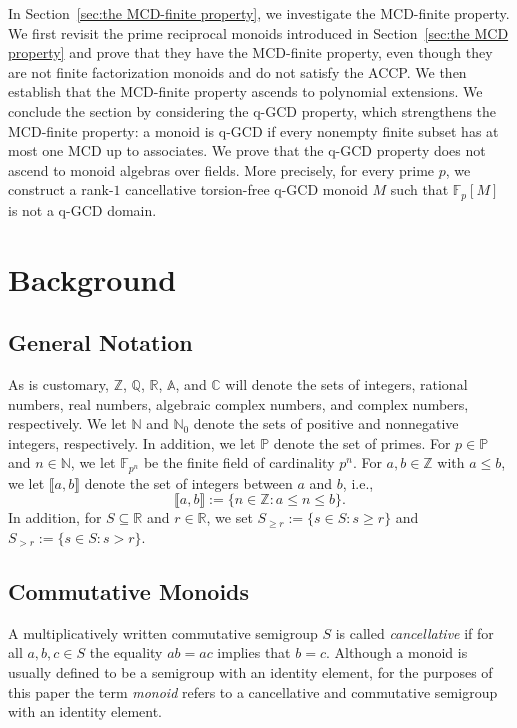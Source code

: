 \documentclass[10pt]{amsart}
\theoremstyle{definition}
\theoremstyle{remark}
\numberwithin{equation}{section}
\newcommand{\aaa}{\mathbb{A}}
\newcommand{\cc}{\mathbb{C}}
\newcommand{\ff}{\mathbb{F}}
\newcommand{\nn}{\mathbb{N}}
\newcommand{\pp}{\mathbb{P}}
\newcommand{\qq}{\mathbb{Q}}
\newcommand{\rr}{\mathbb{R}}
\newcommand{\zz}{\mathbb{Z}}
\providecommand\ldb{\llbracket}
\providecommand\rdb{\rrbracket}
\begin{document}
In Section~\ref{sec:the MCD-finite property}, we investigate the MCD-finite property. We first revisit the prime reciprocal monoids introduced in Section~\ref{sec:the MCD property} and prove that they have the MCD-finite property, even though they are not finite factorization monoids and do not satisfy the ACCP. We then establish that the MCD-finite property ascends to polynomial extensions. We conclude the section by considering the q-GCD property, which strengthens the MCD-finite property: a monoid is q-GCD if every nonempty finite subset has at most one MCD up to associates. We prove that the q-GCD property does not ascend to monoid algebras over fields. More precisely, for every prime $p$, we construct a rank-$1$ cancellative torsion-free q-GCD monoid $M$ such that $\ff_p[M]$ is not a q-GCD domain.







\bigskip
\section{Background}
\label{sec:background}

\smallskip
\subsection{General Notation}

As is customary, $\zz$, $\qq$, $\rr$, $\aaa$, and $\cc$ will denote the sets of integers, rational numbers, real numbers, algebraic complex numbers, and complex numbers, respectively. We let $\nn$ and $\nn_0$ denote the sets of positive and nonnegative integers, respectively. In addition, we let $\pp$ denote the set of primes. For $p \in \pp$ and $n \in \nn$, we let $\ff_{p^n}$ be the finite field of cardinality $p^n$. For $a,b \in \zz$ with $a \le b$, we let $\ldb a,b \rdb$ denote the set of integers between $a$ and $b$, i.e.,
\[
  \ldb a,b \rdb := \{n \in \zz : a \le n \le b\}.
\]
In addition, for $S \subseteq \rr$ and $r \in \rr$, we set $S_{\ge r} := \{s \in S : s \ge r\}$ and $S_{> r} := \{s \in S : s > r\}$.


\medskip
\subsection{Commutative Monoids}

A multiplicatively written commutative semigroup $S$ is called \emph{cancellative} if for all $a,b,c \in S$ the equality $ab = ac$ implies that $b=c$. Although a monoid is usually defined to be a semigroup with an identity element, for the purposes of this paper the term \emph{monoid} refers to a cancellative and commutative semigroup with an identity element.
\smallskip
\end{document}
